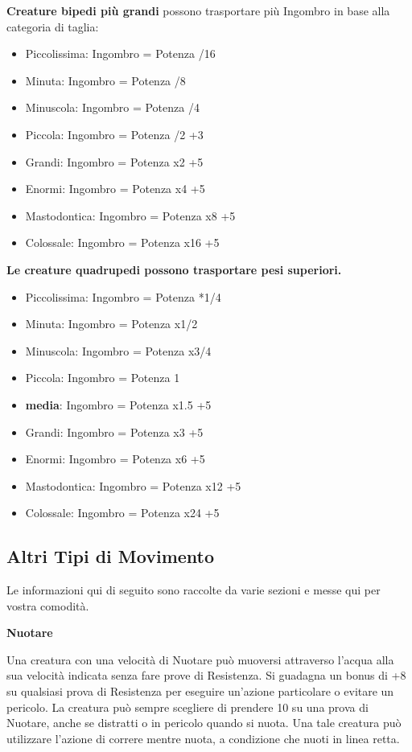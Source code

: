 \documentclass[a4paper,11pt,twoside,openany]{book}
\begin{document}
\textbf{Creature bipedi più grandi} possono trasportare più Ingombro in base alla categoria di taglia:

\begin{itemize}
	\item Piccolissima: Ingombro = Potenza /16
	\item Minuta: Ingombro = Potenza /8
	\item Minuscola: Ingombro = Potenza /4
	\item Piccola: Ingombro = Potenza /2 +3
	\item Grandi: Ingombro = Potenza x2 +5
	\item Enormi: Ingombro = Potenza x4 +5
	\item Mastodontica: Ingombro = Potenza x8 +5
	\item Colossale: Ingombro = Potenza x16 +5
\end{itemize}

\bigskip


\textbf{Le creature quadrupedi possono trasportare pesi superiori. }


\begin{itemize}
	\item Piccolissima: Ingombro = Potenza *1/4
	\item Minuta: Ingombro = Potenza x1/2
	\item Minuscola: Ingombro = Potenza x3/4
	\item Piccola: Ingombro = Potenza 1
	\item \textbf{media}: Ingombro = Potenza x1.5 +5
	\item Grandi: Ingombro = Potenza x3 +5
	\item Enormi: Ingombro = Potenza x6 +5
	\item Mastodontica: Ingombro = Potenza x12 +5
	\item Colossale: Ingombro = Potenza x24 +5
\end{itemize}

\subsection{Altri Tipi di Movimento}

\label{altri-tipi-di-movimento}

Le informazioni qui di seguito sono raccolte da varie sezioni e messe qui per vostra comodità.

\textbf{Nuotare}

Una creatura con una velocità di Nuotare può muoversi attraverso l'acqua alla sua velocità indicata senza fare prove di Resistenza. Si guadagna un bonus di +8 su qualsiasi prova di Resistenza per eseguire un'azione particolare o evitare un pericolo. La creatura può sempre scegliere di prendere 10 su una prova di Nuotare, anche se distratti o in pericolo quando si nuota. Una tale creatura può utilizzare l'azione di correre mentre nuota, a condizione che nuoti in linea retta.
\end{document}
